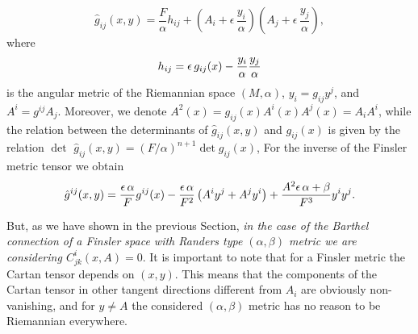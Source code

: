 \documentclass[aps,superscriptaddress, showpacs,preprintnumbers, superscriptaddress, nofootinbibt,twocolumn]{revtex4-2}
\begin{document}
\begin{equation}
  \hat{g}_{ij}(x,y)=\frac{F}{\alpha }h_{ij}  +\left( A_{i}+\epsilon\,\frac{y_{i}}{\alpha }\right) \left( A_{j}+\epsilon\,%
\frac{y_{j}}{\alpha }\right) ,
\end{equation}
where
\begin{equation}\label{angular metric}
    h_{ij}=\epsilon\,g_{ij}(x)-\frac{y_{i}}{%
\alpha }\frac{y_{j}}{\alpha }
\end{equation} is the angular metric of the Riemannian space $(M,\alpha)$, $y_{i}=g_{ij}y^{j}$, and $A^{i}=g^{ij}A_{j}$. Moreover, we denote $%
A^{2}(x)=g_{ij}(x)A^{i}(x)A^{j}(x)=A_{i}A^{i}$, while the relation between
the determinants of $\hat{g}_{ij}(x,y)$ and $g_{ij}(x)$ is given by the
relation $\det $ $\hat{g}_{ij}(x,y)=\left( F/\alpha \right) ^{n+1}\det
g_{ij}(x)$, For the inverse of the Finsler metric tensor we obtain
\begin{equation}
\hat{g}^{ij}(x,y)=\frac{\epsilon\,\alpha }{F}g^{ij}(x)-\frac{%
\epsilon\,\alpha }{F^{2}}\left( A^{i}y^{j}+A^{j}y^{i}\right) +\frac{%
A^{2}\epsilon\,\alpha +\beta }{F^{3}}y^{i}y^{j}.
\end{equation}

But, as we have shown in the previous Section, {\it in the case of the Barthel connection of a Finsler space with Randers type $(\alpha, \beta)$ metric we are considering $ C^i_{jk}(x,A)=0$}.
It is  important to note that for a Finsler metric the Cartan tensor depends on $(x,y)$. This means that the components of the Cartan tensor in other tangent directions different from $A_i$ are obviously non-vanishing, and for $y\neq A$ the considered $(\alpha, \beta)$ metric has no reason to be Riemannian everywhere.
\end{document}
